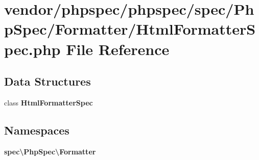 \section{vendor/phpspec/phpspec/spec/\+Php\+Spec/\+Formatter/\+Html\+Formatter\+Spec.php File Reference}
\label{_html_formatter_spec_8php}
\subsection*{Data Structures}
\begin{DoxyCompactItemize}
\item 
class {\bf Html\+Formatter\+Spec}
\end{DoxyCompactItemize}
\subsection*{Namespaces}
\begin{DoxyCompactItemize}
\item 
 {\bf spec\textbackslash{}\+Php\+Spec\textbackslash{}\+Formatter}
\end{DoxyCompactItemize}
